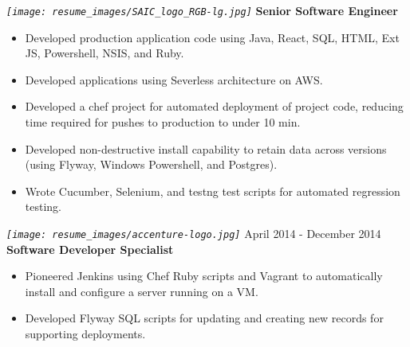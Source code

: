\documentclass[12pt, line, margin]{res}
\begin{document}
\begin{resume}
            {\sl
              \texttt{[image: resume\_images/SAIC\_logo\_RGB-lg.jpg]}
            }
            \newline
            \textbf{Senior Software Engineer}
            \begin{itemize}  \itemsep -2pt %
              \item   Developed production application code using Java, React, SQL, \newline
                          HTML, Ext JS, Powershell, NSIS, and Ruby.
              \item   Developed applications using Severless architecture on AWS.
              \item   Developed a chef project for automated deployment of project \newline
                          code, reducing time required for pushes to production to under 10 min.
              \item   Developed non-destructive install capability to retain data across\newline
                          versions (using Flyway, Windows Powershell, and Postgres).
              \item   Wrote Cucumber, Selenium, and testng test scripts for automated \newline
                          regression testing.
            \end{itemize}


            {\sl
              \texttt{[image: resume\_images/accenture-logo.jpg]}
            }
            \hfill April 2014 - December 2014 \\
            \textbf{Software Developer Specialist}
            \begin{itemize}  \itemsep -2pt %
              \item   Pioneered Jenkins using Chef Ruby scripts and Vagrant\newline
                          to automatically install and configure a server running on a VM.
              \item   Developed Flyway SQL scripts for updating and creating new
                          records for supporting deployments.
            \end{itemize}


\end{resume}
\end{document}
